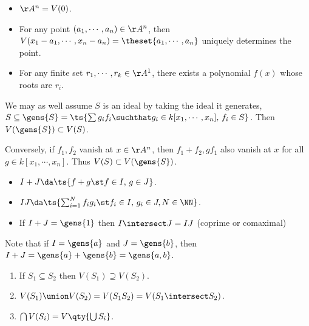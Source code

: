 \begin{example}

\hfill

\begin{itemize}
\tightlist
\item
  \(\AA^n = V(0)\).
\item
  For any point \((a_1, \cdots, a_n)\in \AA^n\), then
  \(V(x_1 - a_1, \cdots, x_n - a_n) = \theset{a_1, \cdots, a_n}\)
  uniquely determines the point.
\item
  For any finite set \(r_1, \cdots, r_k \in \AA^1\), there exists a
  polynomial \(f(x)\) whose roots are \(r_i\).
\end{itemize}

\end{example}

\begin{remark}

We may as well assume \(S\) is an ideal by taking the ideal it
generates,
\(S\subseteq \gens{S} = \ts{\sum g_i f_i \suchthat g_i \in k[x_1, \cdots, x_n],\, f_i\in S}\).
Then \(V(\gens{S}) \subset V(S)\).

Conversely, if \(f_1, f_2\) vanish at \(x\in \AA^n\), then
\(f_1 + f_2, gf_1\) also vanish at \(x\) for all
\(g\in k[x_1, \cdots, x_n]\). Thus \(V(S) \subset V(\gens{S})\).

\end{remark}

\begin{proposition}

\hfill

\begin{itemize}
\tightlist
\item
  \(I+J \da \ts{f+g \st f\in I,\, g\in J}\).
\item
  \(IJ \da \ts{\sum_{i=1}^N f_i g_i \st f_i\in I,\, g_i\in J, N\in \NN}\).
\item
  If \(I+J = \gens{1}\) then \(I\intersect J = IJ\) (coprime or
  comaximal)
\end{itemize}

\end{proposition}

Note that if \(I = \gens{a}\) and \(J = \gens{b}\), then
\(I + J = \gens{a} + \gens{b} = \gens{a, b}\).

\begin{proposition}[Properties of $V$]

\hfill

\begin{enumerate}
\def\labelenumi{\arabic{enumi}.}
\tightlist
\item
  If \(S_1 \subseteq S_2\) then \(V(S_1) \supseteq V(S_2)\).
\item
  \(V(S_1) \union V(S_2) = V(S_1 S_2) = V(S_1 \intersect S_2)\).
\item
  \(\bigcap V(S_i) = V\qty{\bigcup S_i}\).
\end{enumerate}

\end{proposition}

